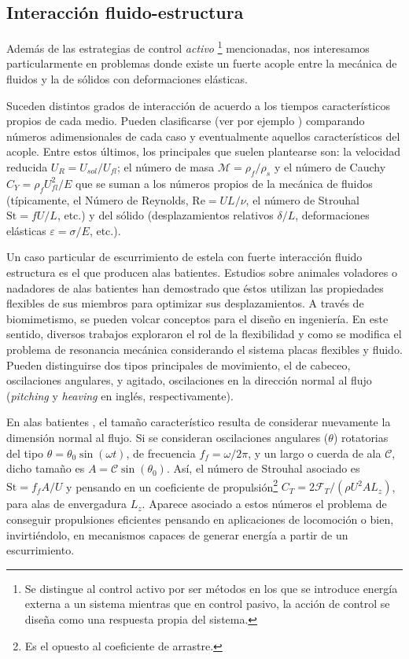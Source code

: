 \documentclass[12pt]{article}
\begin{document}
 \subsection*{Interacción fluido-estructura}
 
 Además de las estrategias de control \textit{activo }\footnote{Se distingue al control activo por ser métodos en los que se introduce energía externa a un sistema mientras que en control pasivo, la acción de control se diseña como una respuesta propia del sistema. } mencionadas, nos interesamos particularmente en problemas donde existe un fuerte acople entre la mecánica de fluidos y la de sólidos con deformaciones  elásticas.	
 	
Suceden distintos grados de interacción de acuerdo a los tiempos característicos propios de cada medio. Pueden clasificarse (ver por ejemplo \cite{paidoussis2010fluid,delangre2001fluides}) comparando números adimensionales de cada caso y eventualmente aquellos característicos del acople.
Entre estos últimos,  los principales que suelen plantearse son: la velocidad reducida $U_R=U_{sol}/U_{fl}$; el número de masa $\mathcal{M}=\rho_f/\rho_s$ y el número de Cauchy $C_Y=\rho_fU_{fl}^2/E$ que se suman a los números propios de la mecánica de fluidos (típicamente, el Número de Reynolds, $\mathrm{Re}=UL/\nu$, el número de Strouhal $\mathrm{St}=fU/L$, etc.) y del sólido (desplazamientos relativos $\delta/L$, deformaciones elásticas $\varepsilon=\sigma/E$, etc.). 

Un caso particular de escurrimiento de estela con fuerte interacción fluido estructura es el que producen alas batientes.  Estudios sobre animales voladores o nadadores de alas batientes\cite{Dickson:2004p232,harrison2000} han demostrado que éstos utilizan las propiedades flexibles de sus miembros para optimizar sus desplazamientos. A través de biomimetismo, se pueden volcar conceptos para el diseño en ingeniería. En este sentido,
diversos trabajos\cite{marais2012,ramananarivo2011a,dewey2013,paraz2016thrust} exploraron el rol de la flexibilidad y como se modifica el problema de resonancia mecánica
considerando el sistema placas flexibles y fluido. Pueden distinguirse dos tipos principales de movimiento, el de cabeceo, oscilaciones angulares, y agitado, oscilaciones en la dirección  normal al flujo (\textit{pitching} y \textit{heaving} en inglés, respectivamente).

En alas batientes , el tamaño característico resulta de considerar nuevamente la dimensión normal al flujo. Si se consideran oscilaciones angulares ($\theta$) rotatorias del tipo $\theta = \theta_0\sin(\omega t)$, de frecuencia $f_f = \omega/2\pi$, y un largo o cuerda de ala $\mathscr C$, dicho tamaño es $A=\mathscr{C} \sin(\theta_0)$. Así, el número de Strouhal asociado es $\mathrm{St}=f_f A / U$ y pensando en un coeficiente de propulsión\footnote{Es el opuesto al coeficiente de arrastre.} $C_T=2\mathscr{F}_T/(\rho U^2 A L_z)$, para alas de envergadura $L_z$. Aparece asociado a estos números el problema de conseguir propulsiones eficientes pensando en aplicaciones de locomoción o bien, invirtiéndolo, en mecanismos capaces de generar energía a partir de un escurrimiento.
\end{document}
